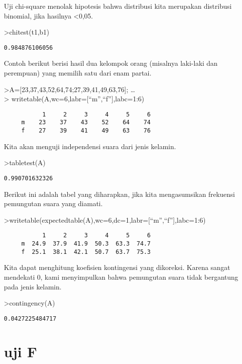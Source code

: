 \documentclass[
]{book}
\begin{document}
Uji chi-square menolak hipotesis bahwa distribusi kita merupakan distribusi binomial, jika hasilnya \textless0,05.

\textgreater chitest(t1,b1)

\begin{verbatim}
0.984876106056
\end{verbatim}

Contoh berikut berisi hasil dua kelompok orang (misalnya laki-laki dan perempuan) yang memilih satu dari enam partai.

\textgreater A={[}23,37,43,52,64,74;27,39,41,49,63,76{]}; \ldots{}\\
\textgreater{} writetable(A,wc=6,labr={[}``m'',``f''{]},labc=1:6)

\begin{verbatim}
           1     2     3     4     5     6
     m    23    37    43    52    64    74
     f    27    39    41    49    63    76
\end{verbatim}

Kita akan menguji independensi suara dari jenis kelamin.

\textgreater tabletest(A)

\begin{verbatim}
0.990701632326
\end{verbatim}

Berikut ini adalah tabel yang diharapkan, jika kita mengasumsikan frekuensi pemungutan suara yang diamati.

\textgreater writetable(expectedtable(A),wc=6,dc=1,labr={[}``m'',``f''{]},labc=1:6)

\begin{verbatim}
           1     2     3     4     5     6
     m  24.9  37.9  41.9  50.3  63.3  74.7
     f  25.1  38.1  42.1  50.7  63.7  75.3
\end{verbatim}

Kita dapat menghitung koefisien kontingensi yang dikoreksi. Karena sangat mendekati 0, kami menyimpulkan bahwa pemungutan suara tidak bergantung pada jenis kelamin.

\textgreater contingency(A)

\begin{verbatim}
0.0427225484717
\end{verbatim}

\chapter{uji F}\label{uji-f}
\end{document}
